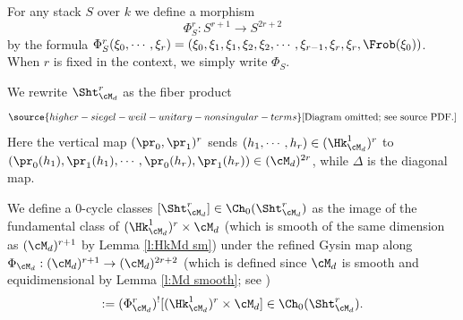 
\begin{defn}
\notready\label{def:Phi} For any stack $S$ over $k$ we define a morphism
\begin{equation}
\Phi^{r}_{S}: S^{r+1}\to S^{2r+2}
\end{equation}
by the formula $\Phi^{r}_{S}(\xi_{0},\cdots, \xi_{r})=(\xi_{0},\xi_{1},\xi_{1},\xi_{2},\xi_{2},\cdots, \xi_{r-1}, \xi_r, \xi_r, \Frob(\xi_{0}))$. When $r$ is fixed in the context, we simply write $\Phi_{S}$.
\end{defn}

We rewrite $\Sht^{r}_{\cM_{d}}$ as the fiber product
\begin{equation}\label{rewrite ShtM}
\source{higher-siegel-weil-unitary-nonsingular-terms}
\text{[Diagram omitted; see source PDF.]}
\end{equation}
Here the vertical map $(\pr_{0},\pr_{1})^{r}$ sends $(h_{1},\cdots, h_{r})\in (\Hk^{1}_{\cM_{d}})^{r} $ to
$(\pr_{0}(h_{1}), \pr_{1}(h_{1}),\cdots, \pr_{0}(h_{r}),\pr_{1}(h_{r}))\in (\cM_{d})^{2r}$, while $\Delta$ is the diagonal map.

\begin{defn}
\notready\label{def: hitchin shtukas class} We define a $0$-cycle classes $[\Sht^{r}_{\cM_{d}}]\in \Ch_{0}(\Sht^{r}_{\cM_{d}})$ as the image of the fundamental class of $(\Hk^{1}_{\cM_{d}})^{r} \times \cM_d$  (which is smooth of the same dimension as $(\cM_{d})^{r+1}$ by Lemma \ref{l:HkMd sm}) under the refined  Gysin map along $\Phi_{\cM_{d}}:(\cM_{d})^{r+1}\to (\cM_{d})^{2r+2}$ (which is defined since $\cM_{d}$ is smooth and equidimensional by Lemma \ref{l:Md smooth}; see \cite[Theorem 2.1.12(xi)]{Kr99})
\begin{equation}
[\Sht^{r}_{\cM_{d}}]:=(\Phi^{r}_{\cM_{d}})^{!}[(\Hk^{1}_{\cM_{d}})^{r} \times \cM_d]\in \Ch_{0}(\Sht^{r}_{\cM_{d}}).
\end{equation}
\end{defn}

